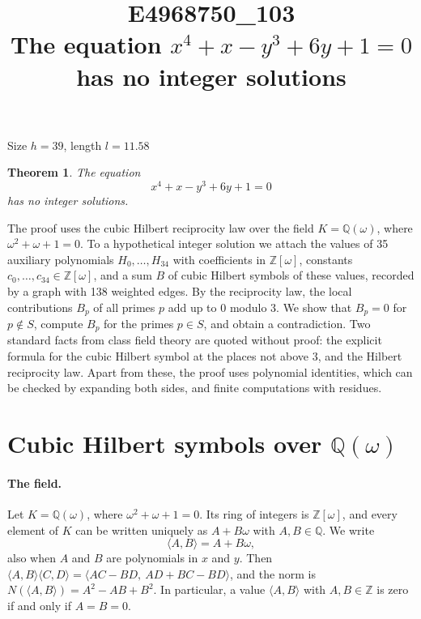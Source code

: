 \documentclass[11pt]{article}
\title{\textbf{E4968750\_103}\\[4pt] {\Large The equation $x^{4}+x-y^{3}+6y+1=0$ has no integer solutions}}
\author{}
\date{}
\newtheorem{theorem}{Theorem}
\newcommand{\Z}{\mathbb{Z}}
\newcommand{\Q}{\mathbb{Q}}
\begin{document}
\maketitle
\vspace{-8ex}
\begin{center}
Size $h=39$, length $l=11.58$
\end{center}

\begin{theorem}\label{thm:main}
The equation
\begin{equation}\label{eq:main}
x^{4}+x-y^{3}+6y+1=0
\end{equation}
has no integer solutions.
\end{theorem}

The proof uses the cubic Hilbert reciprocity law over the field $K=\Q(\omega)$, where $\omega^2+\omega+1=0$. To a hypothetical integer solution we attach the values of 35 auxiliary polynomials $H_0,\dots,H_{34}$ with coefficients in $\Z[\omega]$, constants $c_0,\dots,c_{34}\in\Z[\omega]$, and a sum $B$ of cubic Hilbert symbols of these values, recorded by a graph with 138 weighted edges. By the reciprocity law, the local contributions $B_p$ of all primes $p$ add up to $0$ modulo $3$. We show that $B_p=0$ for $p\notin S$, compute $B_p$ for the primes $p\in S$, and obtain a contradiction. Two standard facts from class field theory are quoted without proof: the explicit formula for the cubic Hilbert symbol at the places not above $3$, and the Hilbert reciprocity law. Apart from these, the proof uses polynomial identities, which can be checked by expanding both sides, and finite computations with residues.


\section{\texorpdfstring{Cubic Hilbert symbols over $\Q(\omega)$}{Cubic Hilbert symbols over Q(w)}}\label{sec:symbols}

\paragraph{The field.} Let $K=\Q(\omega)$, where $\omega^2+\omega+1=0$. Its ring of integers is $\Z[\omega]$, and every element of $K$ can be written uniquely as $A+B\omega$ with $A,B\in\Q$. We write
\[
\langle A,B\rangle=A+B\omega,
\]
also when $A$ and $B$ are polynomials in $x$ and $y$. Then $\langle A,B\rangle\langle C,D\rangle=\langle AC-BD,\ AD+BC-BD\rangle$, and the norm is $N(\langle A,B\rangle)=A^2-AB+B^2$. In particular, a value $\langle A,B\rangle$ with $A,B\in\Z$ is zero if and only if $A=B=0$.
\end{document}
